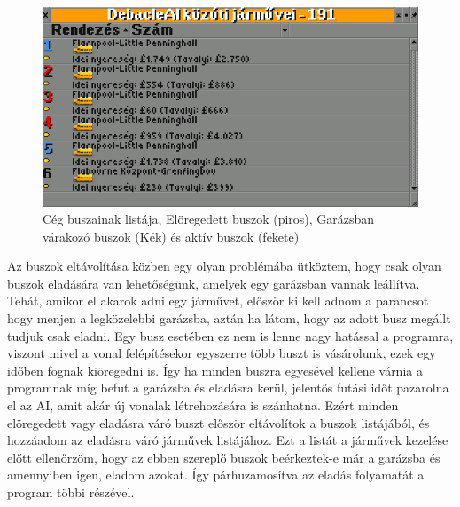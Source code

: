 \begin{figure}[h!]
	\centering
	\includegraphics[width=\textwidth]{images/buszok.png}
	\caption{Cég buszainak listája, Elöregedett buszok (piros), Garázsban várakozó buszok (Kék) és aktív buszok (fekete)}
	\label{fig:vonal}
\end{figure}

Az buszok eltávolítása közben egy olyan problémába ütköztem, hogy csak olyan buszok eladására van lehetőségünk, amelyek egy garázsban vannak leállítva. Tehát, amikor el akarok adni egy járművet, először ki kell adnom a parancsot hogy menjen a legközelebbi garázsba, aztán ha látom, hogy az adott busz megállt tudjuk csak eladni. Egy busz esetében ez nem is lenne nagy hatással a programra, viszont mivel a vonal felépítésekor egyszerre több buszt is vásárolunk, ezek egy időben fognak kiöregedni is. Így ha minden buszra egyesével kellene várnia a programnak míg befut a garázsba és eladásra kerül, jelentős futási időt pazarolna el az AI, amit akár új vonalak létrehozására is szánhatna. Ezért minden elöregedett vagy eladásra váró buszt először eltávolítok a buszok listájából, és hozzáadom az eladásra váró járművek listájához. Ezt a listát a járművek kezelése előtt ellenőrzöm, hogy az ebben szereplő buszok beérkeztek-e már a garázsba és amennyiben igen, eladom azokat. Így párhuzamosítva az eladás folyamatát a program többi részével.
